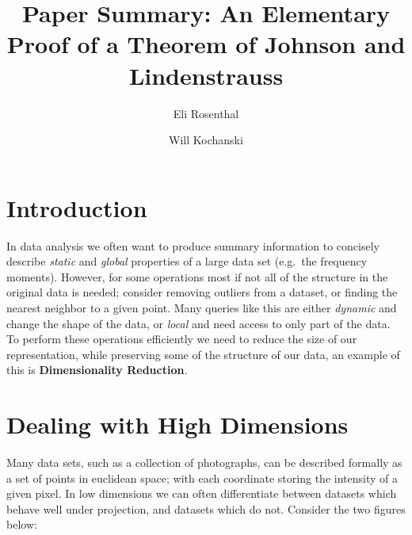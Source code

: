 \documentclass[11pt]{article}
\author{Eli Rosenthal \and Will Kochanski}
\date{}
\title{Paper Summary: An Elementary Proof of a Theorem of Johnson and Lindenstrauss}
\begin{document}
\maketitle
\section{Introduction}

In data analysis we often want to produce summary information to concisely
describe \textit{static} and \textit{global} properties of a large data set
(e.g.~the frequency moments).  However, for some operations most if not all of
the structure in the original data is needed; consider removing outliers from a
dataset, or finding the nearest neighbor to a given point. Many queries like
this are either \textit{dynamic} and change the shape of the data, or
\textit{local} and need access to only part of the data. To perform these
operations efficiently we need to reduce the size of our representation, while
preserving some of the structure of our data, an example of this is
\textbf{Dimensionality Reduction}.

\section{Dealing with High Dimensions}

Many data sets, such as a collection of photographs, can be described formally
as a set of points in euclidean space; with each coordinate storing the
intensity of a given pixel. In low dimensions we can often differentiate between
datasets which behave well under projection, and datasets which do not. Consider
the two figures below:
\end{document}
